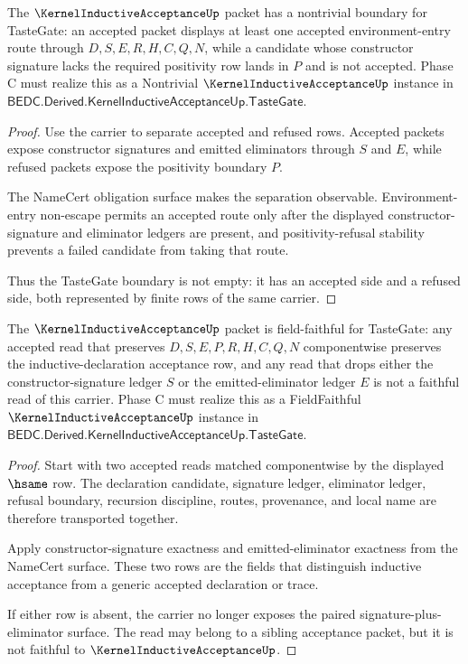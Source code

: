 \begin{theorem}
\label{thm:kernel-inductive-acceptance-nontrivial-boundary}
The $\KernelInductiveAcceptanceUp$ packet has a nontrivial boundary for TasteGate: an accepted packet displays at least one accepted environment-entry route through $D,S,E,R,H,C,Q,N$, while a candidate whose constructor signature lacks the required positivity row lands in $P$ and is not accepted. Phase C must realize this as a Nontrivial $\KernelInductiveAcceptanceUp$ instance in $\mathsf{BEDC.Derived.KernelInductiveAcceptanceUp.TasteGate}$.
\end{theorem}
\begin{proof}
Use the carrier to separate accepted and refused rows. Accepted packets expose constructor signatures and emitted eliminators through $S$ and $E$, while refused packets expose the positivity boundary $P$.

The NameCert obligation surface makes the separation observable. Environment-entry non-escape permits an accepted route only after the displayed constructor-signature and eliminator ledgers are present, and positivity-refusal stability prevents a failed candidate from taking that route.

Thus the TasteGate boundary is not empty: it has an accepted side and a refused side, both represented by finite rows of the same carrier.
\end{proof}

\begin{theorem}
\label{thm:kernel-inductive-acceptance-field-faithful-boundary}
The $\KernelInductiveAcceptanceUp$ packet is field-faithful for TasteGate: any accepted read that preserves $D,S,E,P,R,H,C,Q,N$ componentwise preserves the inductive-declaration acceptance row, and any read that drops either the constructor-signature ledger $S$ or the emitted-eliminator ledger $E$ is not a faithful read of this carrier. Phase C must realize this as a FieldFaithful $\KernelInductiveAcceptanceUp$ instance in $\mathsf{BEDC.Derived.KernelInductiveAcceptanceUp.TasteGate}$.
\end{theorem}
\begin{proof}
Start with two accepted reads matched componentwise by the displayed $\hsame$ row. The declaration candidate, signature ledger, eliminator ledger, refusal boundary, recursion discipline, routes, provenance, and local name are therefore transported together.

Apply constructor-signature exactness and emitted-eliminator exactness from the NameCert surface. These two rows are the fields that distinguish inductive acceptance from a generic accepted declaration or trace.

If either row is absent, the carrier no longer exposes the paired signature-plus-eliminator surface. The read may belong to a sibling acceptance packet, but it is not faithful to $\KernelInductiveAcceptanceUp$.
\end{proof}

